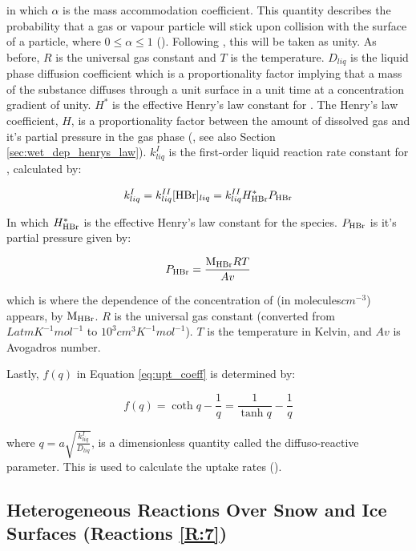 in which $\alpha$ is the mass accommodation coefficient. This quantity describes the probability that a gas or vapour particle will stick upon collision with the surface of a particle, where $0\leq\alpha\leq1$ (\cite{SeinfeldSpyros}). Following \cite{CAO}, this will be taken as unity. As before, $R$ is the universal gas constant and $T$ is the temperature. $D_{liq}$ is the liquid phase diffusion coefficient which is a proportionality factor implying that a mass of the substance diffuses through a unit surface in a unit time at a concentration gradient of unity. $H^*$ is the effective Henry's law constant for . The Henry's law coefficient, $H$, is a proportionality factor between the amount of dissolved gas and it's partial pressure in the gas phase (\cite{Sander2015}, see also Section \ref{sec:wet_dep_henrys_law}). $k_{liq}^I$ is the first-order liquid reaction rate constant for , calculated by: 

\begin{equation}
    k_{liq}^I = k_{liq}^{II}[\mathrm{HBr}]_{liq}= k_{liq}^{II}H^*_{\mathrm{HBr}}P_{\mathrm{HBr}}
\end{equation}

In which $H^*_{\mathrm{HBr}}$ is the effective Henry's law constant for the species. $P_{\mathrm{HBr}}$ is it's partial pressure given by:

\begin{equation*}
    P_{\mathrm{HBr}} = \frac{\mathrm{M_{HBr}}RT}{Av}
\end{equation*}

which is where the dependence of the concentration of  (in molecules$cm^{-3}$) appears, by $\mathrm{M_{HBr}}$. $R$ is the universal gas constant (converted from $LatmK^{-1}mol^{-1}$ to $10^3cm^3K^{-1}mol^{-1}$). $T$ is the temperature in Kelvin, and $Av$ is Avogadros number. 

\medskip

Lastly, $f(q)$ in Equation \ref{eq:upt_coeff} is determined by: 

\begin{equation}
    f(q) = \coth{q} -\frac{1}{q} = \frac{1}{\tanh{q}} -\frac{1}{q}
\end{equation}

where $q = a\sqrt{\frac{k_{liq}^I}{D_{liq}}}$, is a dimensionless quantity called the diffuso-reactive parameter. This is used to calculate the uptake rates (\cite{Hanson1994}). 


\subsection{Heterogeneous Reactions Over Snow and Ice Surfaces (Reactions \ref{R:7})}\label{sec:snow_ice_react}


